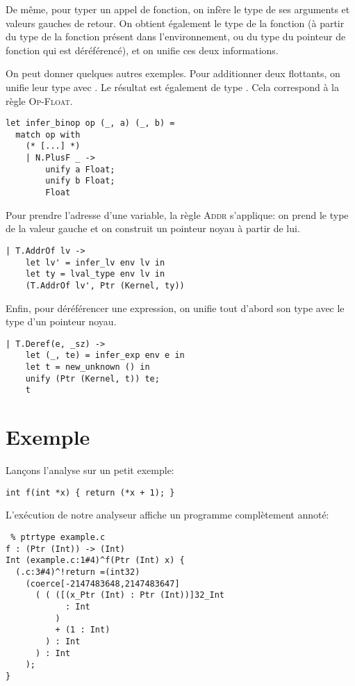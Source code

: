De même, pour typer un appel de fonction, on infère le type de ses arguments et
valeurs gauches de retour. On obtient également le type de la fonction (à partir
du type de la fonction présent dans l'environnement, ou du type du pointeur de
fonction qui est déréférencé), et on unifie ces deux informations.

On peut donner quelques autres exemples. Pour additionner deux flottants, on
unifie leur type avec \tFloat. Le résultat est également de type \tFloat. Cela
correspond à la règle \textsc{Op-Float}.

\begin{verbatim}
let infer_binop op (_, a) (_, b) =
  match op with
    (* [...] *)
    | N.PlusF _ ->
        unify a Float;
        unify b Float;
        Float
\end{verbatim}

Pour prendre l'adresse d'une variable, la règle \textsc{Addr} s'applique: on
prend le type de la valeur gauche et on construit un pointeur noyau à partir de
lui.

\begin{verbatim}
| T.AddrOf lv ->
    let lv' = infer_lv env lv in
    let ty = lval_type env lv in
    (T.AddrOf lv', Ptr (Kernel, ty))
\end{verbatim}

Enfin, pour déréférencer une expression, on unifie tout d'abord son type avec le
type d'un pointeur noyau.

\begin{verbatim}
| T.Deref(e, _sz) ->
    let (_, te) = infer_exp env e in
    let t = new_unknown () in
    unify (Ptr (Kernel, t)) te;
    t
\end{verbatim}

\section{Exemple}

Lançons l'analyse sur un petit exemple:

\begin{verbatim}
int f(int *x) { return (*x + 1); }
\end{verbatim}

L'exécution de notre analyseur affiche un programme complètement annoté:

\begin{verbatim}
 % ptrtype example.c
f : (Ptr (Int)) -> (Int)
Int (example.c:1#4)^f(Ptr (Int) x) {
  (.c:3#4)^!return =(int32)
    (coerce[-2147483648,2147483647]
      ( ( ([(x_Ptr (Int) : Ptr (Int))]32_Int
            : Int
          )
          + (1 : Int)
        ) : Int
      ) : Int
    );
}
\end{verbatim}

